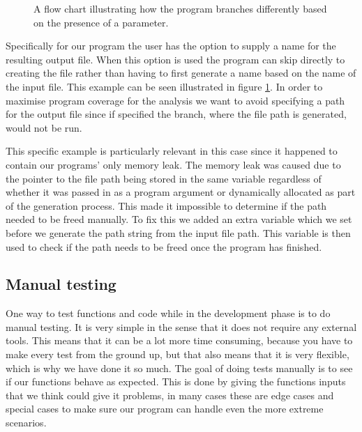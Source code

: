 \begin{figure}[ht!]
    \centering
    \caption{A flow chart illustrating how the program branches differently based on the presence of a parameter.}
    \label{fig:ProgramBranching}
\end{figure}

Specifically for our program the user has the option to supply a name for the resulting output file. When this option is used the program can skip directly to creating the file rather than having to first generate a name based on the name of the input file. This example can be seen illustrated in figure \ref{fig:ProgramBranching}. In order to maximise program coverage for the analysis we want to avoid specifying a path for the output file since if specified the branch, where the file path is generated, would not be run.

This specific example is particularly relevant in this case since it happened to contain our programs' only memory leak. The memory leak was caused due to the pointer to the file path being stored in the same variable regardless of whether it was passed in as a program argument or dynamically allocated as part of the generation process. This made it impossible to determine if the path needed to be freed manually. To fix this we added an extra variable which we set before we generate the path string from the input file path. This variable is then used to check if the path needs to be freed once the program has finished.

\subsection{Manual testing}
One way to test functions and code while in the development phase is to do manual testing. It is very simple in the sense that it does not require any external tools. This means that it can be a lot more time consuming, because you have to make every test from the ground up, but that also means that it is very flexible, which is why we have done it so much. The goal of doing tests manually is to see if our functions behave as expected. This is done by giving the functions inputs that we think could give it problems, in many cases these are edge cases and special cases to make sure our program can handle even the more extreme scenarios.

